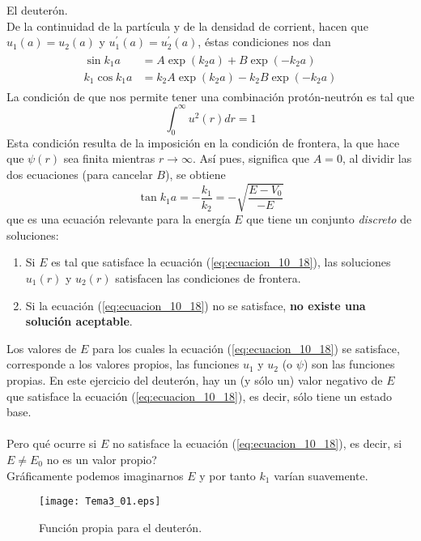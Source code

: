 \begin{ejemplo}{El deuterón.}
\begin{equation}
\label{eq:ecuacion_10_16}
\end{equation}
De la continuidad de la partícula y de la densidad de corrient, hacen que $u_{1}(a) = u_{2}(a)$ y $u^{\prime}_{1}(a) = u^{\prime}_{2}(a)$, éstas condiciones nos dan
\begin{eqnarray}
\begin{aligned}
\sin k_{1} a &= A \exp(k_{2} a) + B \exp(-k_{2}a) \\
k_{1} \cos k_{1} a &= k_{2} A \exp(k_{2} a) - k_{2} B \exp(-k_{2}a)
\label{eq:ecuacion_10_17}
\end{aligned}
\end{eqnarray}
La condición de que nos permite tener una combinación protón-neutrón es tal que
\[ \int_{0}^{\infty} u^{2}(r) dr = 1 \]
Esta condición resulta de la imposición en la condición de frontera, la que hace que $\psi(r)$ sea finita mientras $r \to \infty$. Así pues, significa que $A  =0$, al dividir las dos ecuaciones (para cancelar $B$), se obtiene
\begin{equation}
\tan k_{1} a = - \dfrac{k_{1}}{k_{2}} = - \sqrt{\dfrac{E - V_{0}}{-E}} 
\label{eq:ecuacion_10_18}
\end{equation}
que es una ecuación relevante para la energía $E$ que tiene un conjunto \emph{discreto} de soluciones:
\begin{enumerate}
\item Si $E$ es tal que satisface la ecuación (\ref{eq:ecuacion_10_18}), las soluciones $u_{1}(r)$ y $u_{2}(r)$ satisfacen las condiciones de frontera.
\item Si la ecuación (\ref{eq:ecuacion_10_18}) no se satisface, \textbf{no existe una solución aceptable}.
\end{enumerate}
Los valores de $E$ para los cuales la ecuación (\ref{eq:ecuacion_10_18}) se satisface, corresponde a los valores propios, las funciones $u_{1}$ y $u_{2}$ (o $\psi$) son las funciones propias. En este ejercicio del deuterón, hay un (y sólo un) valor negativo de $E$ que satisface la ecuación (\ref{eq:ecuacion_10_18}), es decir, sólo tiene un estado base.
\\
\\
Pero qué ocurre si $E$ no satisface la ecuación (\ref{eq:ecuacion_10_18}), es decir, si $E \neq E_{0}$ no es un valor propio?
\\
Gráficamente podemos imaginarnos $E$ y por tanto $k_{1}$ varían suavemente.
\begin{figure}[!h]
\centering
\texttt{[image: Tema3\_01.eps]}
\caption{Función propia para el deuterón.}

\end{figure}
\end{ejemplo}
